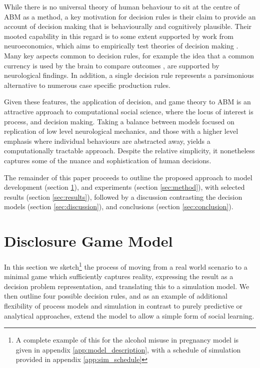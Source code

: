 \documentclass[graybox]{svmult}
\begin{document}
While there is no universal theory of human behaviour to sit at the centre of \ac{ABM} as a method, a key motivation for decision rules is their claim to provide an account of decision making that is behaviourally and cognitively plausible. Their mooted capability in this regard is to some extent supported by work from neuroeconomics, which aims to empirically test theories of decision making \citep{Rustichini2009}. Many key aspects common to decision rules, for example the idea that a common currency is used by the brain to compare outcomes \citep{Padoa-Schioppa2006,Padoa-Schioppa2008}, are supported by neurological findings. In addition, a single decision rule represents a parsimonious alternative to numerous case specific production rules. 

Given these features, the application of decision, and game theory to \ac{ABM} is an attractive approach to computational social science, where the locus of interest is process, and decision making. Taking a balance between models focused on replication of low level neurological mechanics, and those with a higher level emphasis where individual behaviours are abstracted away, yields a computationally tractable approach. Despite the relative simplicity, it nonetheless captures some of the nuance and sophistication of human decisions.


The remainder of this paper proceeds to outline the proposed approach to model development (section \ref{sec:model}), and experiments (section \ref{sec:method}), with selected results (section \ref{sec:results}), followed by a discussion contrasting the decision models (section \ref{sec:discussion}), and conclusions (section \ref{sec:conclusion}). 
\section{Disclosure Game Model}
\label{sec:model}

In this section we sketch\footnote{A complete example of this for the alcohol misuse in pregnancy model is given in appendix \ref{app:model_description}, with a schedule of simulation provided in appendix \ref{app:sim_schedule}} the process of moving from a real world scenario to a minimal game which sufficiently captures reality, expressing the result as a decision problem representation, and translating this to a simulation model. We then outline four possible decision rules, and as an example of additional flexibility of process models and simulation in contrast to purely predictive or analytical approaches, extend the model to allow a simple form of social learning.
\end{document}
